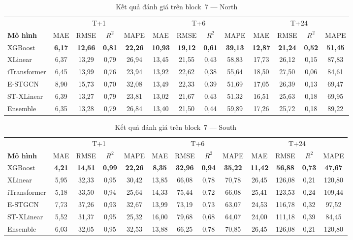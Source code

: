 \begin{table}[H]
\centering
\caption{Kết quả đánh giá trên block~7 --- North}
\label{tab:block7_north}
\small
\begin{tabular}{l|cccc|cccc|cccc}
\toprule
 & \multicolumn{4}{c|}{T+1} & \multicolumn{4}{c|}{T+6} & \multicolumn{4}{c}{T+24} \\
\textbf{Mô hình} & MAE & RMSE & $R^2$ & MAPE & MAE & RMSE & $R^2$ & MAPE & MAE & RMSE & $R^2$ & MAPE \\
\midrule
XGBoost     & \textbf{6,17} & \textbf{12,66} & \textbf{0,81} & \textbf{22,26} & \textbf{10,93} & \textbf{19,12} & \textbf{0,61} & \textbf{39,13} & \textbf{12,87} & \textbf{21,24} & \textbf{0,52} & \textbf{51,45} \\
XLinear     & 6,37 & 13,29 & 0,79 & 26,94 & 13,45 & 21,55 & 0,43 & 58,83 & 17,73 & 26,12 & 0,15 & 87,83 \\
iTransformer & 6,45 & 13,99 & 0,76 & 23,94 & 13,92 & 22,62 & 0,38 & 55,64 & 18,50 & 27,50 & 0,06 & 84,61 \\
E-STGCN     & 8,90 & 15,73 & 0,70 & 32,08 & 13,49 & 22,33 & 0,39 & 51,69 & 17,05 & 26,39 & 0,13 & 69,47 \\
ST-XLinear  & 6,39 & 13,27 & 0,79 & 23,81 & 13,02 & 21,67 & 0,43 & 51,32 & 16,51 & 25,63 & 0,18 & 69,95 \\
Ensemble    & 6,35 & 13,28 & 0,79 & 26,84 & 13,40 & 21,50 & 0,44 & 59,89 & 17,26 & 25,72 & 0,18 & 89,22 \\
\bottomrule
\end{tabular}
\end{table}

\begin{table}[H]
\centering
\caption{Kết quả đánh giá trên block~7 --- South}
\label{tab:block7_south}
\small
\begin{tabular}{l|cccc|cccc|cccc}
\toprule
 & \multicolumn{4}{c|}{T+1} & \multicolumn{4}{c|}{T+6} & \multicolumn{4}{c}{T+24} \\
\textbf{Mô hình} & MAE & RMSE & $R^2$ & MAPE & MAE & RMSE & $R^2$ & MAPE & MAE & RMSE & $R^2$ & MAPE \\
\midrule
XGBoost     & \textbf{4,21} & \textbf{14,51} & \textbf{0,99} & \textbf{22,26} & \textbf{8,35} & \textbf{32,96} & \textbf{0,94} & \textbf{35,22} & \textbf{11,42} & \textbf{56,88} & \textbf{0,73} & \textbf{47,67} \\
XLinear     & 5,95 & 32,33 & 0,95 & 30,42 & 13,85 & 66,08 & 0,78 & 70,78 & 26,45 & 126,08 & 0,21 & 120,80 \\
iTransformer & 5,18 & 33,50 & 0,94 & 25,64 & 14,33 & 75,44 & 0,72 & 66,08 & 25,41 & 123,53 & 0,24 & 109,44 \\
E-STGCN     & 7,73 & 37,26 & 0,93 & 32,67 & 13,99 & 73,19 & 0,73 & 63,07 & 24,53 & 116,78 & 0,32 & 97,52 \\
ST-XLinear  & 5,52 & 31,37 & 0,95 & 25,32 & 16,00 & 79,68 & 0,68 & 64,07 & 24,00 & 111,18 & 0,39 & 84,45 \\
Ensemble    & 6,03 & 32,05 & 0,95 & 32,53 & 13,88 & 66,25 & 0,78 & 70,85 & 26,45 & 126,08 & 0,21 & 120,80 \\
\bottomrule
\end{tabular}
\end{table}


